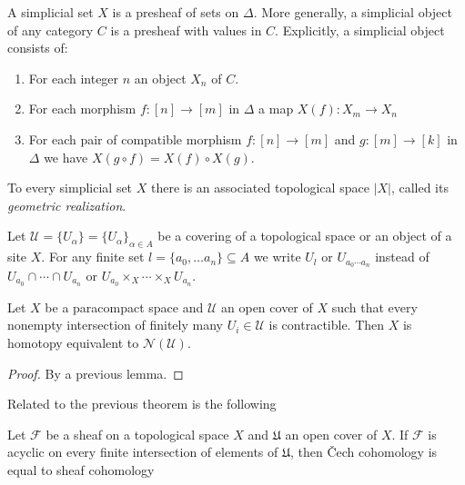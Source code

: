 A simplicial set $X$ is a presheaf of sets on $\Delta$. More generally, a simplicial object of any category $C$ is a presheaf with values in $C$.  Explicitly, a simplicial object consists of:
\begin{enumerate}
  \item For each integer $n$ an object $X_n$ of $C$.
  \item For each morphism $f: [n] \to [m]$ in $\Delta$ a map $X(f) : X_m \to X_n$
  \item For each pair of compatible morphism $f: [n] \to [m]$ and $g: [m] \to [k]$ in $\Delta$ we have $X(g \circ f) = X(f) \circ X(g)$.
\end{enumerate}
To every simplicial set $X$ there is an associated topological space $|X|$, called its \textit{geometric realization}.




Let $\mathcal{U} = \{U_\alpha\} = \{U_\alpha\}_{\alpha \in A}$ be a covering of a topological space or an object of a site $X$. For any finite set $l = \{a_0, \dots a_n\} \subseteq A$ we write $U_l$ or $U_{a_0 \cdots a_n}$ instead of $U_{a_0} \cap \cdots \cap U_{a_n}$ or $U_{a_0} \times_X \cdots \times_X U_{a_n}$.

\begin{theorem}
  Let $X$ be a paracompact space and $\mathcal{U}$ an open cover of $X$ such that every nonempty intersection of finitely many $U_i \in \mathcal{U}$ is contractible. Then $X$ is homotopy equivalent to $\mathcal{N(U)}$.
\end{theorem}
\begin{proof}
  By a previous lemma. %

\end{proof}

Related to the previous theorem is the following
\begin{theorem}
  Let $\mathcal{F}$ be a sheaf on a topological space $X$ and $\mathfrak{U}$ an open cover of $X$. If $\mathcal{F}$ is acyclic on every finite intersection of elements of $\mathfrak{U}$, then \v{C}ech cohomology is equal to sheaf cohomology
\end{theorem}